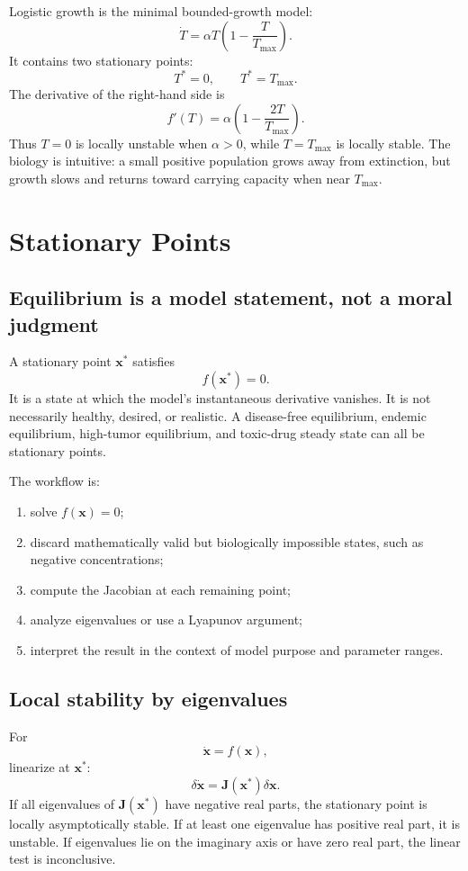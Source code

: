 \documentclass[a4paper]{article}
\newcommand{\vect}[1]{\boldsymbol{#1}}
\newcommand{\mat}[1]{\mathbf{#1}}
\newcommand{\J}{\mat J}
\begin{document}
Logistic growth is the minimal bounded-growth model:
\[
  \dot T=\alpha T\left(1-\frac{T}{T_{\max}}\right).
\]
It contains two stationary points:
\[
  T^\ast=0,\qquad T^\ast=T_{\max}.
\]
The derivative of the right-hand side is
\[
  f'(T)=\alpha\left(1-\frac{2T}{T_{\max}}\right).
\]
Thus \(T=0\) is locally unstable when \(\alpha>0\), while \(T=T_{\max}\) is locally stable. The biology is intuitive: a small positive population grows away from extinction, but growth slows and returns toward carrying capacity when near \(T_{\max}\).

\section{Stationary Points}

\subsection{Equilibrium is a model statement, not a moral judgment}

A stationary point \(\vect x^\ast\) satisfies
\[
  f(\vect x^\ast)=0.
\]
It is a state at which the model's instantaneous derivative vanishes. It is not necessarily healthy, desired, or realistic. A disease-free equilibrium, endemic equilibrium, high-tumor equilibrium, and toxic-drug steady state can all be stationary points.

The workflow is:
\begin{enumerate}[leftmargin=2em]
  \item solve \(f(\vect x)=0\);
  \item discard mathematically valid but biologically impossible states, such as negative concentrations;
  \item compute the Jacobian at each remaining point;
  \item analyze eigenvalues or use a Lyapunov argument;
  \item interpret the result in the context of model purpose and parameter ranges.
\end{enumerate}

\subsection{Local stability by eigenvalues}

For
\[
  \dot{\vect x}=f(\vect x),
\]
linearize at \(\vect x^\ast\):
\[
  \delta\dot{\vect x}=\J(\vect x^\ast)\delta\vect x.
\]
If all eigenvalues of \(\J(\vect x^\ast)\) have negative real parts, the stationary point is locally asymptotically stable. If at least one eigenvalue has positive real part, it is unstable. If eigenvalues lie on the imaginary axis or have zero real part, the linear test is inconclusive.
\end{document}
